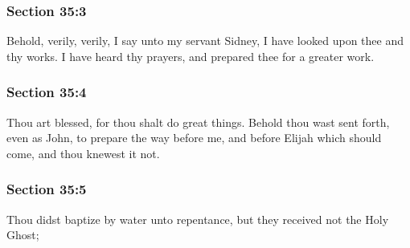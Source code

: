 	\subsubsection{Section 35:3} %
		\label{DC35-3}

		Behold, verily, verily, I say unto my servant Sidney, I have looked upon thee and thy works.  I have heard thy prayers, and prepared thee for a greater work.


	\subsubsection{Section 35:4} %
		\label{DC35-4}

		Thou art blessed, for thou shalt do great things.  Behold thou wast sent forth, even as John, to prepare the way before me, and before Elijah which should come, and thou knewest it not.


	\subsubsection{Section 35:5} %
		\label{DC35-5}

		Thou didst baptize by water unto repentance, but they received not the Holy Ghost;


